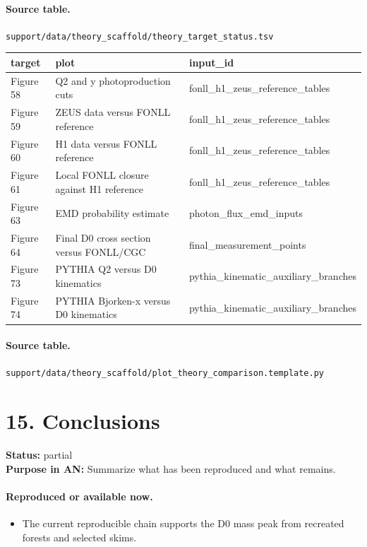\documentclass[11pt]{article}
\begin{document}
\paragraph{Source table.} \texttt{support/data/theory\_scaffold/theory\_target\_status.tsv}
\begin{center}\scriptsize
\begin{tabular}{|l|l|l|}
\hline
target & plot & input\_id \\ \hline
Figure 58 & Q2 and y photoproduction cuts & fonll\_h1\_zeus\_reference\_tables \\ \hline
Figure 59 & ZEUS data versus FONLL reference & fonll\_h1\_zeus\_reference\_tables \\ \hline
Figure 60 & H1 data versus FONLL reference & fonll\_h1\_zeus\_reference\_tables \\ \hline
Figure 61 & Local FONLL closure against H1 reference & fonll\_h1\_zeus\_reference\_tables \\ \hline
Figure 63 & EMD probability estimate & photon\_flux\_emd\_inputs \\ \hline
Figure 64 & Final D0 cross section versus FONLL/CGC & final\_measurement\_points \\ \hline
Figure 73 & PYTHIA Q2 versus D0 kinematics & pythia\_kinematic\_auxiliary\_branches \\ \hline
Figure 74 & PYTHIA Bjorken-x versus D0 kinematics & pythia\_kinematic\_auxiliary\_branches \\ \hline
\end{tabular}
\end{center}
\paragraph{Source table.} \texttt{support/data/theory\_scaffold/plot\_theory\_comparison.template.py}
\section*{15. Conclusions}
\textbf{Status:} partial\\
\textbf{Purpose in AN:} Summarize what has been reproduced and what remains.
\paragraph{Reproduced or available now.}
\begin{itemize}
\item The current reproducible chain supports the D0 mass peak from recreated forests and selected skims.
\end{itemize}
\end{document}
